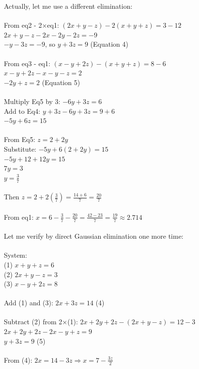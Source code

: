 \documentclass[11pt]{article}
\begin{document}
Actually, let me use a different elimination:\\
\\
From eq2 - 2×eq1: \((2x+y-z) - 2(x+y+z) = 3 - 12\)\\
\(2x+y-z - 2x - 2y - 2z = -9\)\\
\(-y - 3z = -9\), so \(y + 3z = 9\)  (Equation 4)\\
\\
From eq3 - eq1: \((x-y+2z) - (x+y+z) = 8 - 6\)\\
\(x - y + 2z - x - y - z = 2\)\\
\(-2y + z = 2\)  (Equation 5)\\
\\
Multiply Eq5 by 3: \(-6y + 3z = 6\)\\
Add to Eq4: \(y + 3z - 6y + 3z = 9 + 6\)\\
\(-5y + 6z = 15\)  \\
\\
From Eq5: \(z = 2 + 2y\)\\
Substitute: \(-5y + 6(2+2y) = 15\)\\
\(-5y + 12 + 12y = 15\)\\
\(7y = 3\)\\
\(y = \frac{3}{7}\)\\
\\
Then \(z = 2 + 2(\frac{3}{7}) = \frac{14+6}{7} = \frac{20}{7}\)\\
\\
From eq1: \(x = 6 - \frac{3}{7} - \frac{20}{7} = \frac{42-23}{7} = \frac{19}{7} \approx 2.714\)\\
\\
Let me verify by direct Gaussian elimination one more time:\\
\\
System:\\
(1) \(x + y + z = 6\)\\
(2) \(2x + y - z = 3\)\\
(3) \(x - y + 2z = 8\)\\
\\
Add (1) and (3): \(2x + 3z = 14\)  (4)\\
\\
Subtract (2) from 2×(1): \(2x + 2y + 2z - (2x + y - z) = 12 - 3\)\\
\(2x + 2y + 2z - 2x - y + z = 9\)\\
\(y + 3z = 9\)  (5)\\
\\
From (4): \(2x = 14 - 3z \Rightarrow x = 7 - \frac{3z}{2}\)\\
\end{document}
